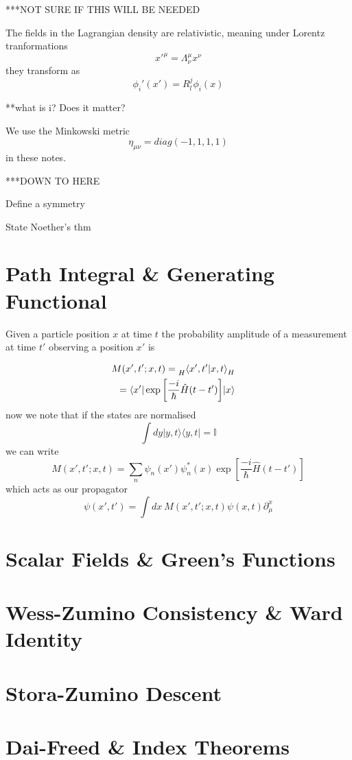 \documentclass[11pt, a4paper]{article}
\theoremstyle{definition}
\theoremstyle{plain}
\begin{document}
\newpage


***NOT SURE IF THIS WILL BE NEEDED


The fields in the Lagrangian density are relativistic, 
meaning under Lorentz tranformations
\[ x'^{\mu} = \Lambda^{\mu}_{\nu} x^{\nu} \]
they transform as 
\[ \phi_i'(x') = R_l^j \phi_i(x) \]

**what is i? Does it matter?

We use the Minkowski metric 
\[ \eta_{\mu \nu} = diag(-1,1,1,1) \]
in these notes.

***DOWN TO HERE 

Define a symmetry

State Noether's thm



\section{Path Integral \& Generating Functional}
Given a particle position $x$ at time $t$ the probability amplitude of
a measurement at time $t'$ observing a position $x'$ is

\begin{align*}
  \begin{split}
  M(x', t'; x, t) &= \prescript{}{H}{\braket{x',t'|x, t}_{H}}
  \end{split} \\
  \begin{split}
  &= \braket{x'|\exp{\left[\frac{-i}{\hbar}\hat{H}(t-t')\right]}|x}
  \end{split}
\end{align*}\label{eq:1}
now we note that if the states are normalised
\begin{equation}
  \int{dy |y,t\rangle{} \langle{y,t|} } = \mathbb{I}
\end{equation}
we can write 
  \begin{equation}
    M(x', t'; x, t) = \sum_{n}{\psi_{n}(x')\psi_{n}^*(x)\exp{\left[\frac{-i}{\hbar}\hat{H}(t-t')\right]}}
  \end{equation}
which acts as our propagator
\begin{equation}
 \psi(x', t') = \int{dx \ M(x', t'; x, t) \psi(x, t)}
 \partial^{x}_{\mu}
\end{equation}


\section{Scalar Fields \& Green's Functions}
\section{Wess-Zumino Consistency \& Ward Identity}
\section{Stora-Zumino Descent}
\section{Dai-Freed \& Index Theorems}

\newpage


\end{document}
